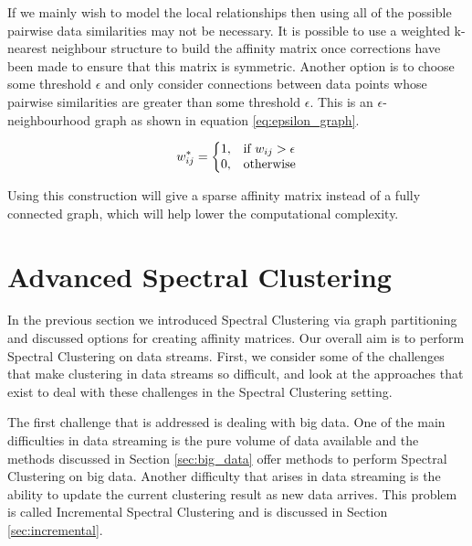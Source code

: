 If we mainly wish to model the local relationships then using all of the possible pairwise data similarities may not be necessary. It is possible to use a weighted k-nearest neighbour structure \citep{Luxburg2008} to build the affinity matrix once corrections have been made to ensure that this matrix is symmetric. Another option is to choose some threshold $\epsilon$ and only consider connections between data points whose pairwise similarities are greater  than some threshold $\epsilon$. This is an $\epsilon$-neighbourhood graph as shown in equation \eqref{eq:epsilon_graph}. 


\begin{equation}
\label{eq:epsilon_graph}
  w^*_{ij}=\left\{
  \begin{array}{@{}ll@{}}
    1, & \text{if}\ w_{ij} > \epsilon \\
    0, & \text{otherwise}
  \end{array}\right.
\end{equation} 

Using this construction will give a sparse affinity matrix instead of a fully connected graph, which will help lower the computational complexity. 

\section{Advanced Spectral Clustering}
\label{sec:ad_spec}

In the previous section we introduced Spectral Clustering via graph partitioning and discussed options for creating affinity matrices. Our overall aim is to perform Spectral Clustering on data streams. First, we consider some of the challenges that make clustering in data streams so difficult, and look at the approaches that exist to deal with these challenges in the Spectral Clustering setting.

 The first challenge that is addressed is dealing with big data. One of the main difficulties in data streaming is the pure volume of data available and the methods discussed in Section \ref{sec:big_data} offer methods to perform Spectral Clustering on big data.  Another difficulty that arises in data streaming is the ability to update the current clustering result  as new data arrives.  This problem is called Incremental Spectral Clustering and is discussed in Section \ref{sec:incremental}.

